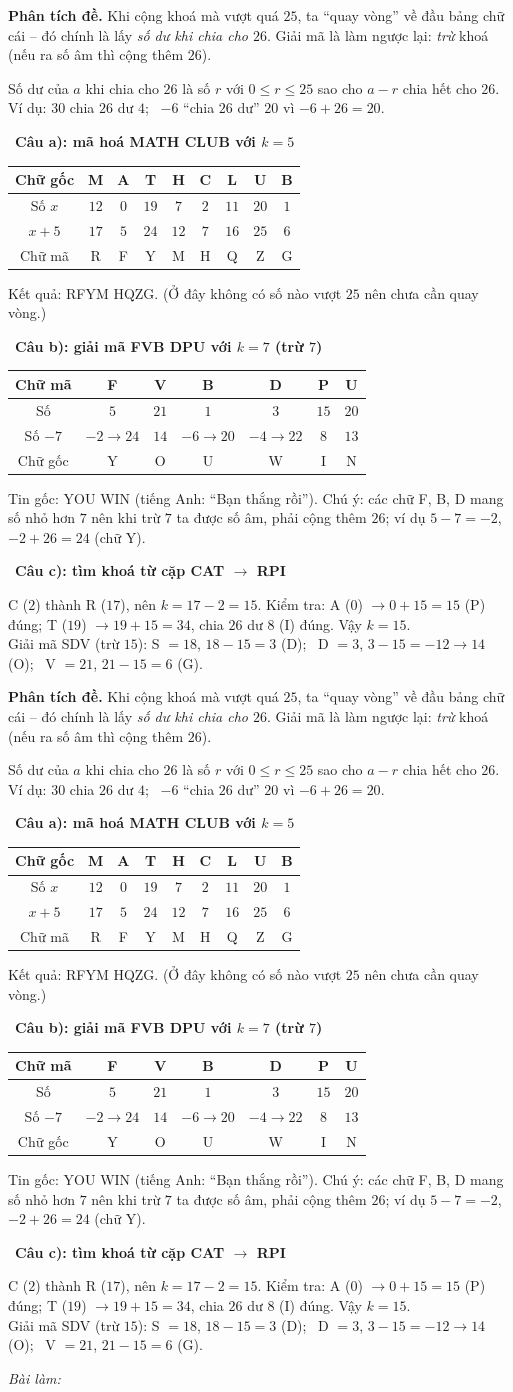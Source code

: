 \documentclass[11pt]{article}
\newif\ifsol \soltrue
\newcommand{\StuProb}[2]{\begin{probboxS}{#1}{#2}\StuProbBody\end{probboxS}}
\newcommand{\probsol}[1]{%
  \begin{lrbox}{\solmeasure}\begin{minipage}{\dimexpr\linewidth-24pt\relax}#1\end{minipage}\end{lrbox}%
  \ifsol
    \begin{solbox}#1\end{solbox}%
  \else
    \setlength{\solht}{\dimexpr\ht\solmeasure+\dp\solmeasure+0.85cm\relax}%
    \ifdim\solht<1.35cm\setlength{\solht}{1.35cm}\fi
    \ifdim\solht>\StudentMaxWork\setlength{\solht}{\StudentMaxWork}\fi
    \par\noindent\begin{minipage}{\linewidth}%
    \expandafter\StuProb\StuProbArgs
    \begin{tcolorbox}[colback=white,colframe=Line,boxrule=0.8pt,arc=5pt,
      left=8pt,right=8pt,top=4pt,bottom=4pt,height=\solht]{\footnotesize\color{Slate}\itshape\WorkWord}\end{tcolorbox}%
    \end{minipage}\par\medskip
  \fi}
\newlength{\StudentMaxWork}\setlength{\StudentMaxWork}{4.5cm}
\newcommand{\step}[2]{\par\smallskip\noindent{\bfseries\color{tmBlue!85!black}\StepWord~#1.}\ {\bfseries #2}\par\nopagebreak}
\def\WorkWord{Bài làm:}
\def\StepWord{Bước}
\begin{document}
\probsol{
\textbf{Phân tích đề.} Khi cộng khoá mà vượt quá $25$, ta ``quay vòng'' về đầu bảng chữ cái -- đó chính là lấy \emph{số dư khi
chia cho $26$}. Giải mã là làm ngược lại: \emph{trừ} khoá (nếu ra số âm thì cộng thêm $26$).
\begin{recallbox}Số dư của $a$ khi chia cho $26$ là số $r$ với $0 \le r \le 25$ sao cho $a - r$ chia hết cho $26$.
Ví dụ: $30$ chia $26$ dư $4$; \ $-6$ ``chia $26$ dư'' $20$ vì $-6 + 26 = 20$.\end{recallbox}
\step{1}{Câu a): mã hoá \textsf{MATH CLUB} với $k = 5$}
\begin{center}\small
\begin{tabular}{|c|c|c|c|c|c|c|c|c|}
\hline
\rowcolor{tmBlue!10} Chữ gốc & M & A & T & H & C & L & U & B\\ \hline
Số $x$ & $12$ & $0$ & $19$ & $7$ & $2$ & $11$ & $20$ & $1$\\ \hline
$x + 5$ & $17$ & $5$ & $24$ & $12$ & $7$ & $16$ & $25$ & $6$\\ \hline
Chữ mã & R & F & Y & M & H & Q & Z & G\\ \hline
\end{tabular}
\end{center}
Kết quả: \textsf{RFYM HQZG}. (Ở đây không có số nào vượt $25$ nên chưa cần quay vòng.)
\step{2}{Câu b): giải mã \textsf{FVB DPU} với $k = 7$ (trừ $7$)}
\begin{center}\small
\begin{tabular}{|c|c|c|c|c|c|c|}
\hline
\rowcolor{tmBlue!10} Chữ mã & F & V & B & D & P & U\\ \hline
Số & $5$ & $21$ & $1$ & $3$ & $15$ & $20$\\ \hline
Số $- 7$ & $-2 \to 24$ & $14$ & $-6 \to 20$ & $-4 \to 22$ & $8$ & $13$\\ \hline
Chữ gốc & Y & O & U & W & I & N\\ \hline
\end{tabular}
\end{center}
Tin gốc: \textsf{YOU WIN} (tiếng Anh: ``Bạn thắng rồi''). Chú ý: các chữ F, B, D mang số nhỏ hơn $7$ nên khi trừ $7$ ta được số âm,
phải cộng thêm $26$; ví dụ $5 - 7 = -2$, $-2 + 26 = 24$ (chữ Y).
\step{3}{Câu c): tìm khoá từ cặp \textsf{CAT} $\to$ \textsf{RPI}}
C ($2$) thành R ($17$), nên $k = 17 - 2 = 15$. Kiểm tra: A ($0$) $\to 0 + 15 = 15$ (P) đúng; T ($19$) $\to 19 + 15 = 34$,
chia $26$ dư $8$ (I) đúng. Vậy $k = 15$.\\
Giải mã \textsf{SDV} (trừ $15$): S $= 18$, $18 - 15 = 3$ (D); \ D $= 3$, $3 - 15 = -12 \to 14$ (O); \ V $= 21$, $21 - 15 = 6$ (G).
}
\end{document}
